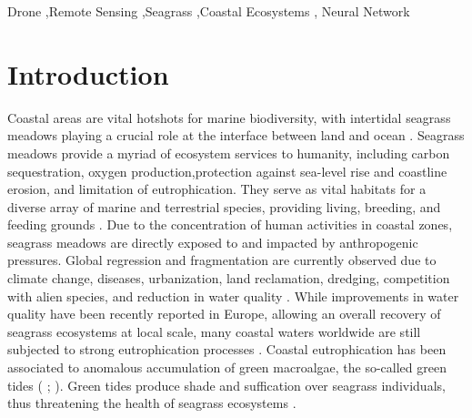 \documentclass[
  number]{elsarticle}
\begin{document}
\begin{frontmatter}
\begin{keyword}
    Drone \sep Remote Sensing \sep Seagrass \sep Coastal
Ecosystems \sep 
    Neural Network
\end{keyword}
\end{frontmatter}
    
\section{Introduction}\label{introduction}

Coastal areas are vital hotshots for marine biodiversity, with
intertidal seagrass meadows playing a crucial role at the interface
between land and ocean \citep{unsworth2022}. Seagrass meadows provide a
myriad of ecosystem services to humanity, including carbon
sequestration, oxygen production,protection against sea-level rise and
coastline erosion, and limitation of eutrophication. They serve as vital
habitats for a diverse array of marine and terrestrial species,
providing living, breeding, and feeding grounds \citetext{\citealp[
]{gardner2018}; \citealp[ ]{Zoffoli2022}; \citealp{jankowska2019}}. Due
to the concentration of human activities in coastal zones, seagrass
meadows are directly exposed to and impacted by anthropogenic pressures.
Global regression and fragmentation are currently observed due to
climate change, diseases, urbanization, land reclamation, dredging,
competition with alien species, and reduction in water quality
\citetext{\citealp[ ]{nguyen2021}; \citealp[ ]{soissons2018}; \citealp[
]{orth2006}; \citealp[ ]{lin2018}; \citealp{duffy2019}}. While
improvements in water quality have been recently reported in Europe,
allowing an overall recovery of seagrass ecosystems at local scale, many
coastal waters worldwide are still subjected to strong eutrophication
processes \citetext{\citealp[ ]{deSantos2019}; \citealp{Zoffoli2021}}.
Coastal eutrophication has been associated to anomalous accumulation of
green macroalgae, the so-called green tides (\citep{devlin2023nutrients}
; \citep{devlin2023nutrients}). Green tides produce shade and
suffication over seagrass individuals, thus threatening the health of
seagrass ecosystems \citep{wang2022}.
\end{document}

